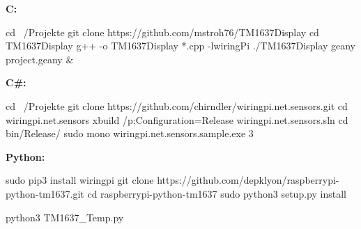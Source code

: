 
\textbf{C:} 

\begin{console}
	cd ~/Projekte
	git clone https://github.com/mstroh76/TM1637Display
	cd TM1637Display
	g++ -o TM1637Display *.cpp -lwiringPi
	./TM1637Display
	geany project.geany & 
\end{console}

\textbf{C\#:}

\begin{console}
	cd ~/Projekte
	git clone https://github.com/chirndler/wiringpi.net.sensors.git
	cd wiringpi.net.sensors
	xbuild /p:Configuration=Release wiringpi.net.sensors.sln
	cd bin/Release/
	sudo mono wiringpi.net.sensors.sample.exe 3
\end{console}

\clearpage
\textbf{Python:}
\begin{console}
	sudo pip3 install wiringpi
	git clone https://github.com/depklyon/raspberrypi-python-tm1637.git
	cd raspberrypi-python-tm1637
	sudo python3 setup.py install
\end{console}

\lstset{language=Python, caption=, 
        label=TM1637Program, frame=single, basicstyle=\ttfamily
	      \footnotesize, breakatwhitespace=false, showstringspaces=false, 
        showtabs=false, tabsize=2 }


\begin{console}
	python3 TM1637_Temp.py
\end{console}